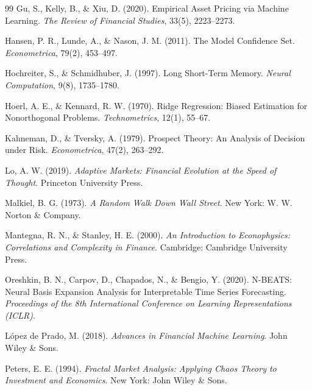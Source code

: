 ﻿\documentclass[11pt,a4paper]{article}
\begin{document}
\begin{thebibliography}{99}
Gu, S., Kelly, B., \& Xiu, D. (2020).
\newblock Empirical Asset Pricing via Machine Learning.
\newblock \textit{The Review of Financial Studies}, 33(5), 2223--2273.

Hansen, P. R., Lunde, A., \& Nason, J. M. (2011).
\newblock The Model Confidence Set.
\newblock \textit{Econometrica}, 79(2), 453--497.

Hochreiter, S., \& Schmidhuber, J. (1997).
\newblock Long Short-Term Memory.
\newblock \textit{Neural Computation}, 9(8), 1735--1780.

Hoerl, A. E., \& Kennard, R. W. (1970).
\newblock Ridge Regression: Biased Estimation for Nonorthogonal Problems.
\newblock \textit{Technometrics}, 12(1), 55--67.

Kahneman, D., \& Tversky, A. (1979).
\newblock Prospect Theory: An Analysis of Decision under Risk.
\newblock \textit{Econometrica}, 47(2), 263--292.

Lo, A. W. (2019).
\newblock \textit{Adaptive Markets: Financial Evolution at the Speed of Thought}.
\newblock Princeton University Press.

Malkiel, B. G. (1973).
\newblock \textit{A Random Walk Down Wall Street}.
\newblock New York: W. W. Norton \& Company.

Mantegna, R. N., \& Stanley, H. E. (2000).
\newblock \textit{An Introduction to Econophysics: Correlations and Complexity in Finance}.
\newblock Cambridge: Cambridge University Press.

Oreshkin, B. N., Carpov, D., Chapados, N., \& Bengio, Y. (2020).
\newblock N-BEATS: Neural Basis Expansion Analysis for Interpretable Time Series Forecasting.
\newblock \textit{Proceedings of the 8th International Conference on Learning Representations (ICLR)}.

L\'opez de Prado, M. (2018).
\newblock \textit{Advances in Financial Machine Learning}.
\newblock John Wiley \& Sons.

Peters, E. E. (1994).
\newblock \textit{Fractal Market Analysis: Applying Chaos Theory to Investment and Economics}.
\newblock New York: John Wiley \& Sons.


\end{thebibliography}
\end{document}

